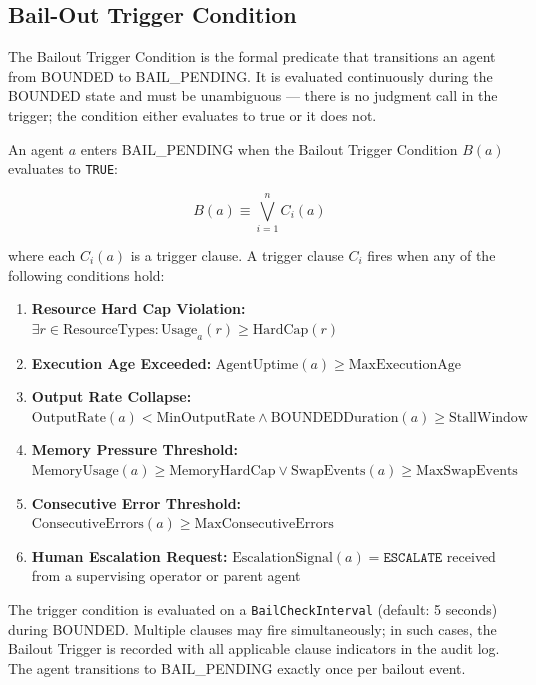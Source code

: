 \bigskip
\subsection{Bail-Out Trigger Condition}

The Bailout Trigger Condition is the formal predicate that transitions an agent from BOUNDED to BAIL\_PENDING. It is evaluated continuously during the BOUNDED state and must be unambiguous — there is no judgment call in the trigger; the condition either evaluates to true or it does not.

\begin{definition}\label{def:bail_trigger}
An agent $a$ enters BAIL\_PENDING when the Bailout Trigger Condition $B(a)$ evaluates to \texttt{TRUE}:

\[
B(a) \equiv \bigvee_{i=1}^{n} C_i(a)
\]

where each $C_i(a)$ is a trigger clause. A trigger clause $C_i$ fires when any of the following conditions hold:

\begin{enumerate}
\item \textbf{Resource Hard Cap Violation:} $\exists r \in \text{ResourceTypes}: \text{Usage}_a(r) \geq \text{HardCap}(r)$
\item \textbf{Execution Age Exceeded:} $\text{AgentUptime}(a) \geq \text{MaxExecutionAge}$
\item \textbf{Output Rate Collapse:} $\text{OutputRate}(a) < \text{MinOutputRate} \land \text{BOUNDEDDuration}(a) \geq \text{StallWindow}$
\item \textbf{Memory Pressure Threshold:} $\text{MemoryUsage}(a) \geq \text{MemoryHardCap} \lor \text{SwapEvents}(a) \geq \text{MaxSwapEvents}$
\item \textbf{Consecutive Error Threshold:} $\text{ConsecutiveErrors}(a) \geq \text{MaxConsecutiveErrors}$
\item \textbf{Human Escalation Request:} $\text{EscalationSignal}(a) = \texttt{ESCALATE}$ received from a supervising operator or parent agent
\end{enumerate}
\end{definition}

\bigskip
\begin{note}
The trigger condition is evaluated on a \texttt{BailCheckInterval} (default: 5 seconds) during BOUNDED. Multiple clauses may fire simultaneously; in such cases, the Bailout Trigger is recorded with all applicable clause indicators in the audit log. The agent transitions to BAIL\_PENDING exactly once per bailout event.
\end{note}

